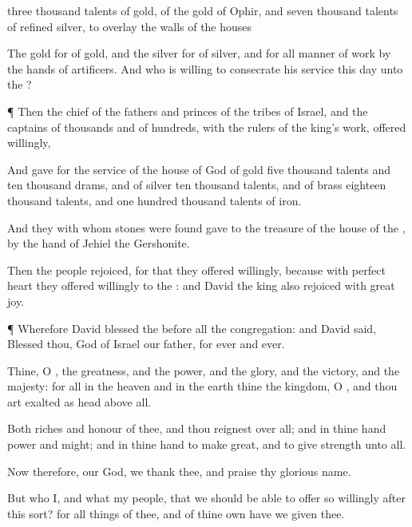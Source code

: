 {
three
thousand
talents of
gold, of the
gold of
Ophir, and
seven
thousand
talents of
refined
silver, to
overlay the
walls of the
houses
{}

The
gold for
{} of
gold, and the
silver for
{} of
silver, and for all manner of
work
{} by the
hands of
artificers. And who
{} is
willing to
consecrate his
service this
day unto the
{}?


\par }{\PP {}¶ Then the
chief of the
fathers and
princes of the
tribes of
Israel, and the
captains of
thousands and of
hundreds, with the
rulers of the
king’s
work, offered
willingly,

And
gave for the
service of the
house of
God of
gold
five
thousand
talents and ten
thousand
drams, and of
silver
ten
thousand
talents, and of
brass
eighteen
thousand
talents, and one
hundred
thousand
talents of
iron.

And they with whom
{}
stones were
found
gave
{} to the
treasure of the
house of the
{}, by the
hand of
Jehiel the
Gershonite.

Then the
people
rejoiced, for that they offered
willingly, because with
perfect
heart they offered
willingly to the
{}: and
David the
king also
rejoiced with
great
joy.


\par }{\PP {}¶ Wherefore
David
blessed the
{}
before all the
congregation: and
David
said,
Blessed
{} thou,
{}
God of
Israel our
father,
for
ever and
ever.

Thine, O
{},
{} the
greatness, and the
power, and the
glory, and the
victory, and the
majesty: for all
{} in the
heaven and in the
earth
{} thine
{} the
kingdom, O
{}, and thou art
exalted as
head above all.

Both
riches and
honour
{} of
thee, and thou
reignest over all; and in thine
hand
{}
power and
might; and in thine
hand
{} to make
great, and to give
strength unto all.

Now therefore, our
God, we
thank thee, and
praise thy
glorious
name.

But who
{} I, and what
{} my
people, that we should
be
able to offer so
willingly after this sort? for all things
{} of thee, and of thine
own have we
given thee.

}
